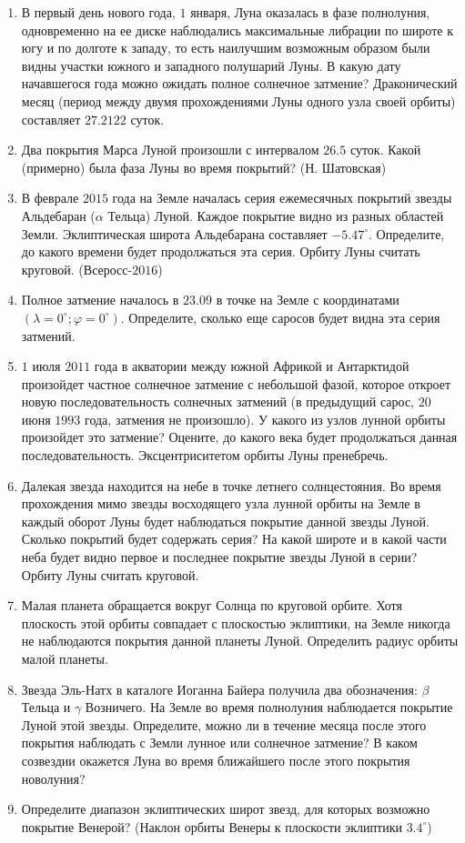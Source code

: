 \documentclass[12pt]{article}
\begin{document}
\begin{enumerate}
 	\item В первый день нового года, $1$ января, Луна оказалась в фазе полнолуния, одновременно на ее диске наблюдались максимальные либрации по широте к югу и по долготе к западу, то есть наилучшим возможным образом были видны участки южного и западного полушарий Луны. В какую дату начавшегося года можно ожидать полное солнечное затмение? Драконический месяц (период между двумя прохождениями Луны одного узла своей орбиты) составляет $27.2122$ суток.
 	\item Два покрытия Марса Луной произошли с интервалом $26.5$ суток. Какой (примерно) была фаза Луны во время покрытий? (Н. Шатовская)
 	\item В феврале $2015$ года на Земле началась серия ежемесячных покрытий звезды Альдебаран ($\alpha$ Тельца) Луной. Каждое покрытие видно из разных областей Земли. Эклиптическая широта Альдебарана составляет $-5.47^{\circ}$. Определите, до какого времени будет продолжаться эта серия. Орбиту Луны считать круговой. (Всеросс-$2016$)
 	\item Полное затмение началось в $23.09$ в точке на Земле с координатами $(\lambda=0^{\circ};\varphi=0^{\circ})$. Определите, сколько еще саросов будет видна эта серия затмений.
 	\item $1$ июля $2011$ года в акватории между южной Африкой и Антарктидой произойдет частное солнечное затмение с небольшой фазой, которое откроет новую последовательность солнечных затмений (в предыдущий сарос, $20$ июня $1993$ года, затмения не произошло). У какого из узлов лунной орбиты произойдет это затмение? Оцените, до какого века будет продолжаться данная последовательность. Эксцентриситетом орбиты Луны пренебречь.
 	\item Далекая звезда находится на небе в точке летнего солнцестояния. Во время прохождения мимо звезды восходящего узла лунной орбиты на Земле в каждый оборот Луны будет наблюдаться покрытие данной звезды Луной. Сколько покрытий будет содержать серия? На какой широте и в какой части неба будет видно первое и последнее покрытие звезды Луной в серии? Орбиту Луны считать круговой.
 	\item Малая планета обращается вокруг Солнца по круговой орбите. Хотя плоскость этой орбиты совпадает с плоскостью эклиптики, на Земле никогда не наблюдаются покрытия данной планеты Луной. Определить радиус орбиты малой планеты.
 	\item Звезда Эль-Натх в каталоге Иоганна Байера  получила два обозначения: $\beta$ Тельца и $\gamma$ Возничего. На Земле во время полнолуния наблюдается покрытие Луной этой звезды. Определите, можно ли в течение месяца после этого покрытия наблюдать с Земли лунное или солнечное затмение? В каком созвездии окажется Луна во время ближайшего после этого покрытия новолуния?
 	\item Определите диапазон эклиптических широт звезд, для которых возможно покрытие Венерой? (Наклон орбиты Венеры к плоскости эклиптики $3.4^{\circ}$)
\end{enumerate}
\end{document}
